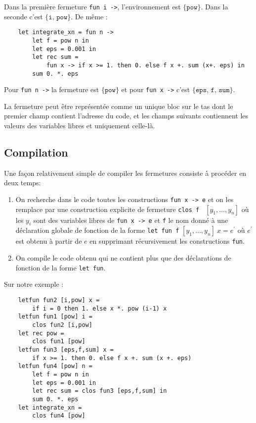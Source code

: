 \documentclass{cours}
\begin{document}
Dans la première fermeture \texttt{fun i ->}, l'environnement est $\{\texttt{pow}\}$. Dans la seconde c'est $\{\texttt{i, pow}\}$. De même : 
\begin{verbatim}
    let integrate_xn = fun n ->
        let f = pow n in
        let eps = 0.001 in
        let rec sum = 
            fun x -> if x >= 1. then 0. else f x +. sum (x+. eps) in
        sum 0. *. eps
\end{verbatim}
Pour \texttt{fun n ->} la fermeture est $\{\texttt{pow}\}$ et pour \texttt{fun x ->} c'est $\{\texttt{eps, f, sum}\}$.


La fermeture peut être représentée comme un unique bloc sur le tas dont le premier champ contient l'adresse du code, et les champs suivants contiennent les valeurs des variables libres et uniquement celle-là. 

\subsection{Compilation}
Une façon relativement simple de compiler les fermetures consiste à procéder en deux temps: 
\begin{enumerate}
    \item On recherche dans le code toutes les constructions \texttt{fun x -> e} et on les remplace par une construction explicite de fermeture \texttt{clos f } $[y_{1}, \ldots, y_{n}]$ où les $y_{i}$ sont des variables libres de \texttt{fun x -> e} et \texttt{f} le nom donné à une déclaration globale de fonction de la forme \texttt{let fun f} $[y_{1}, \ldots, y_{n}]\ x = e^{'}$ où $e^{'}$ est obtenu à partir de $e$ en supprimant récursivement les constructions \texttt{fun}.
    \item On compile le code obtenu qui ne contient plus que des déclarations de fonction de la forme \texttt{let fun}. 
\end{enumerate}

Sur notre exemple : 
\begin{verbatim}
    letfun fun2 [i,pow] x =
        if i = 0 then 1. else x *. pow (i-1) x
    letfun fun1 [pow] i =
        clos fun2 [i,pow]
    let rec pow =
        clos fun1 [pow]
    letfun fun3 [eps,f,sum] x =
        if x >= 1. then 0. else f x +. sum (x +. eps)
    letfun fun4 [pow] n =
        let f = pow n in
        let eps = 0.001 in
        let rec sum = clos fun3 [eps,f,sum] in
        sum 0. *. eps
    let integrate_xn =
        clos fun4 [pow]
\end{verbatim}
\end{document}
